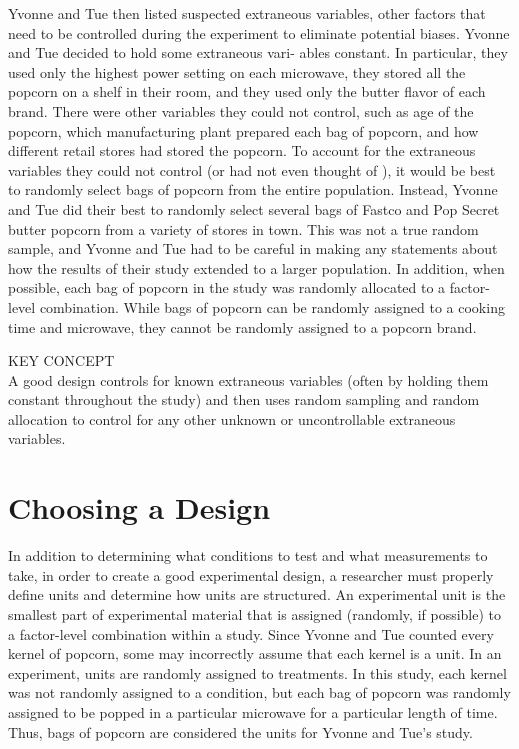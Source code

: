 \documentclass[
]{report}
\theoremstyle{definition}
\theoremstyle{definition}
\theoremstyle{definition}
\theoremstyle{definition}
\theoremstyle{remark}
\begin{document}
Yvonne and Tue then listed suspected extraneous variables, other factors that need to be controlled
during the experiment to eliminate potential biases. Yvonne and Tue decided to hold some extraneous vari-
ables constant. In particular, they used only the highest power setting on each microwave, they stored all
the popcorn on a shelf in their room, and they used only the butter flavor of each brand. There were other
variables they could not control, such as age of the popcorn, which manufacturing plant prepared each bag
of popcorn, and how different retail stores had stored the popcorn. To account for the extraneous variables
they could not control (or had not even thought of ), it would be best to randomly select bags of popcorn from
the entire population. Instead, Yvonne and Tue did their best to randomly select several bags of Fastco and
Pop Secret butter popcorn from a variety of stores in town. This was not a true random sample, and Yvonne
and Tue had to be careful in making any statements about how the results of their study extended to a larger
population. In addition, when possible, each bag of popcorn in the study was randomly allocated to a factor-
level combination. While bags of popcorn can be randomly assigned to a cooking time and microwave, they
cannot be randomly assigned to a popcorn brand.

KEY CONCEPT\\
A good design controls for known extraneous variables (often by holding them constant throughout
the study) and then uses random sampling and random allocation to control for any other unknown or
uncontrollable extraneous variables.

\hypertarget{choosing-a-design}{%
\section{Choosing a Design}\label{choosing-a-design}}

In addition to determining what conditions to test and what measurements to take, in order to create a good
experimental design, a researcher must properly define units and determine how units are structured. An
experimental unit is the smallest part of experimental material that is assigned (randomly, if possible) to a
factor-level combination within a study. Since Yvonne and Tue counted every kernel of popcorn, some may
incorrectly assume that each kernel is a unit. In an experiment, units are randomly assigned to treatments.
In this study, each kernel was not randomly assigned to a condition, but each bag of popcorn was randomly
assigned to be popped in a particular microwave for a particular length of time. Thus, bags of popcorn are
considered the units for Yvonne and Tue's study.
\end{document}
